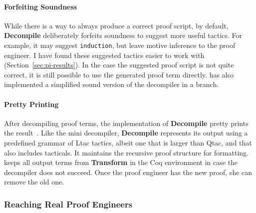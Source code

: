 \paragraph{Forfeiting Soundness}
While there is a way to always produce a correct proof script,
by default, \textbf{Decompile} deliberately forfeits soundness to suggest more useful tactics.
For example, it may suggest \lstinline{induction}, but leave motive inference to the proof engineer.
I have found these suggested tactics easier to work with (Section~\ref{sec:pi-results}).
In the case the suggested proof script is not quite correct,
it is still possible to use the generated proof term directly.
 has also implemented a simplified sound
version of the decompiler in a branch. %

\paragraph{Pretty Printing}
After decompiling proof terms, the implementation of \textbf{Decompile} pretty prints the result~\href{https://github.com/uwplse/coq-plugin-lib/blob/9ef05815c261de9c99b604c6b581ba1c4fbc1a46/src/coq/decompiler/decompiler.ml}{}.
Like the mini decompiler, \textbf{Decompile} represents its output using a predefined grammar of Ltac tactics,
albeit one that is larger than Qtac, and that also includes tacticals.
It maintains the recursive proof structure for formatting. %
\toolnamec keeps all output terms from \textbf{Transform} in the Coq environment in case the decompiler does not succeed.
Once the proof engineer has the new proof, she can remove the old one.

\subsubsection{Reaching Real Proof Engineers}
\label{sec:engineers}


